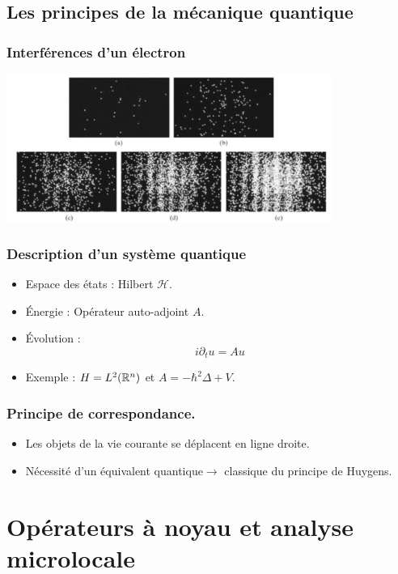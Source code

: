 \documentclass[mathserif]{beamer}
\begin{document}
      \subsection{Les principes de la mécanique quantique}
      \begin{frame}
        \frametitle{Interférences d'un électron}
        \begin{center}
          \includegraphics[width=0.8\textwidth]{electrons-slit.jpg}
        \end{center}
      \end{frame}
      \begin{frame}
        \frametitle{Description d'un système quantique}
        \begin{itemize}
        \item Espace des états : Hilbert $\mathcal{H}$.
        \item Énergie : Opérateur auto-adjoint $A$.
        \item Évolution : \[i\partial_t u = A u\]
          \item Exemple : $H=L^2(\mathbb{R}^n)$ et $A=-\hbar^2\Delta+V$.
        \end{itemize}
      \end{frame}

      \begin{frame}
        \frametitle{Principe de correspondance.}
        \begin{itemize}
        \item Les objets de la vie courante se déplacent \og en ligne
          droite\fg{}.
        \item Nécessité d'un équivalent quantique$\to$ classique du
          principe de Huygens.
        \end{itemize}
      \end{frame}

\section{Opérateurs à noyau et analyse microlocale}
\end{document}
